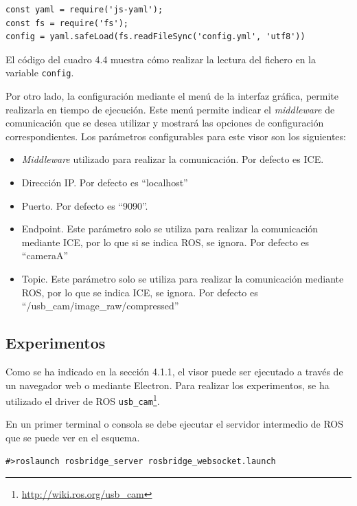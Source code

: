 \begin{lstlisting}[caption = Leer el fichero ``YAML'' con la configuración y guardar la información en una variable, label = cod.yaml]
const yaml = require('js-yaml');
const fs = require('fs');
config = yaml.safeLoad(fs.readFileSync('config.yml', 'utf8'))
\end{lstlisting}

El código del cuadro 4.4 muestra cómo realizar la lectura del fichero en la variable \texttt{config}.

Por otro lado, la configuración mediante el menú de la interfaz gráfica, permite realizarla en tiempo de ejecución. Este menú permite indicar el \textit{middleware} de comunicación que se desea utilizar y mostrará las opciones de configuración correspondientes. Los parámetros configurables para este visor son los siguientes:
\begin{itemize}
\item \textit{Middleware} utilizado para realizar la comunicación. Por defecto es ICE.
\item Dirección IP. Por defecto es ``localhost''
\item Puerto. Por defecto es ``9090''.
\item Endpoint. Este parámetro solo se utiliza para realizar la comunicación mediante ICE, por lo que si se indica ROS, se ignora. Por defecto es ``cameraA''
\item Topic. Este parámetro solo se utiliza para realizar la comunicación mediante ROS, por lo que se indica ICE, se ignora. Por defecto es ``/usb\_cam/image\_raw/compressed''
\end{itemize}

\subsection{Experimentos}
Como se ha indicado en la sección 4.1.1, el visor puede ser ejecutado a través de un navegador web o mediante Electron. Para realizar los experimentos, se ha utilizado el driver de ROS \texttt{usb\_cam}\footnote{\url{http://wiki.ros.org/usb_cam}}.

En un primer terminal o consola se debe ejecutar el servidor intermedio de ROS que se puede ver en el esquema.

\begin{lstlisting}[caption= Ejecución del servidor intermedio, label=cod.servidorintermediocamviz]
#>roslaunch rosbridge_server rosbridge_websocket.launch
\end{lstlisting}

